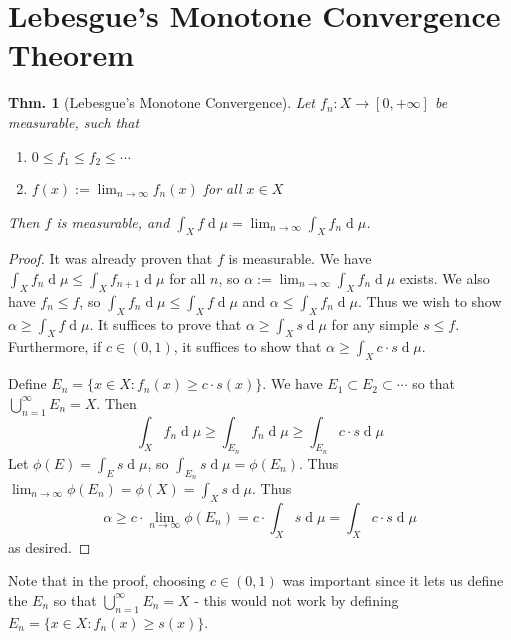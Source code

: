 \documentclass[12pt, a4paper]{book}
\renewcommand{\d}[1]{\ensuremath{\operatorname{d}\!{#1}}} %
\newtheorem{theorem}{Thm.}[section]
\theoremstyle{nonumberplain}
\newtheorem{proof}{Proof}
\begin{document}
\section{Lebesgue's Monotone Convergence Theorem}
\begin{theorem}[Lebesgue's Monotone Convergence]
    Let $f_n:X\to[0,+\infty]$ be measurable, such that
    \begin{enumerate}[nolistsep, label=(\roman*)]
        \item $0\leq f_1\leq f_2\leq\cdots$
        \item $f(x):=\lim_{n\to\infty} f_n(x)$ for all $x\in X$
    \end{enumerate}
    Then $f$ is measurable, and $\int_X f\d{\mu}=\lim_{n\to\infty}\int_X f_n\d{\mu}$.
\end{theorem}
\begin{proof}
    It was already proven that $f$ is measurable.
    We have $\int_X f_n\d{\mu}\leq \int_X f_{n+1}\d{\mu}$ for all $n$, so $\alpha:=\lim_{n\to\infty}\int_X f_n \d{\mu}$ exists.
    We also have $f_n\leq f$, so $\int_X f_n\d{\mu}\leq \int_X f\d{\mu}$ and $\alpha\leq\int_X f_n\d{\mu}$.
    Thus we wish to show $\alpha\geq \int_Xf\d{\mu}$.
    It suffices to prove that $\alpha\geq\int_X s\d{\mu}$ for any simple $s\leq f$.
    Furthermore, if $c\in(0,1)$, it suffices to show that $\alpha\geq\int_X c\cdot s\d{\mu}$.

    Define $E_n=\{x\in X:f_n(x)\geq c\cdot s(x)\}$.
    We have $E_1\subset E_2\subset\cdots$ so that $\bigcup\limits_{n=1}^\infty E_n=X$.
    Then
    \begin{equation*}
        \int_X f_n\d{\mu} \geq \int_{E_n} f_n\d{\mu}\geq \int_{E_n} c\cdot s\d{\mu}
    \end{equation*}
    Let $\phi(E)=\int_E s\d{\mu}$, so $\int_{E_n}s\d{\mu}=\phi(E_n)$.
    Thus $\lim_{n\to\infty}\phi(E_n)=\phi(X)=\int_X s\d{\mu}$.
    Thus
    \begin{equation*}
        \alpha\geq c\cdot \lim_{n\to\infty}\phi(E_n)=c\cdot\int_X s\d{\mu}=\int_X c\cdot s\d{\mu}
    \end{equation*}
    as desired.
\end{proof}
Note that in the proof, choosing $c\in(0,1)$ was important since it lets us define the $E_n$ so that $\bigcup_{n=1}^\infty E_n=X$ - this would not work by defining $E_n=\{x\in X:f_n(x)\geq s(x)\}$.
\end{document}
